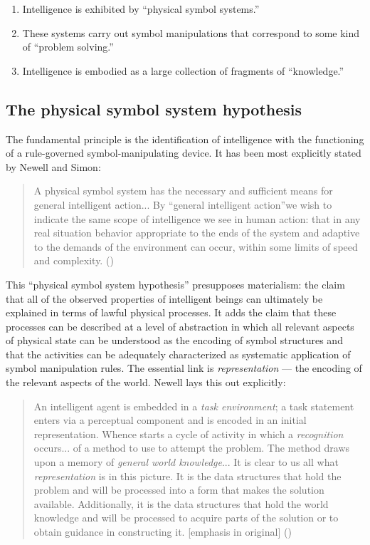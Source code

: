 \documentclass[12pt]{article}
\def\bq{\begin{quote}}
\def\eq{\end{quote}}
\begin{document}
\begin{enumerate}
\item Intelligence is exhibited by ``physical symbol systems.''
\item These systems carry out symbol manipulations that correspond to some
kind of ``problem solving.''
\item Intelligence is embodied as a large collection of fragments of
``knowledge.''
\end{enumerate}

\subsection{The physical symbol system hypothesis}

The fundamental principle is the identification of intelligence with the functioning of a rule-governed symbol-manipulating device. It has been most explicitly stated by Newell and Simon:

\bq
A physical symbol system has the necessary and sufficient means for general intelligent action... By ``general intelligent action''we wish to indicate the same scope of intelligence we see in human action: that in any real situation behavior appropriate to the ends of the system and adaptive to the demands of the environment can occur, within some limits of speed and complexity. ({\it \cite{newell1976}})
\eq

This ``physical symbol system hypothesis'' presupposes materialism: the claim that all of the observed properties of intelligent beings can ultimately be explained in terms of lawful physical processes. It adds the claim that these processes can be described at a level of abstraction in which all relevant aspects of physical state can be understood as the encoding of symbol structures and that the activities can be adequately characterized as systematic application of symbol manipulation rules.
The essential link is {\it representation} --- the encoding of the relevant aspects of the world. Newell lays this out explicitly:
\bq
An intelligent agent is embedded in a {\it task environment};  a task statement
enters via a perceptual component and is encoded in an initial
representation. Whence starts a cycle of activity in which a {\it recognition} occurs... of a method to use to attempt the problem. The method draws upon a memory of {\it general world knowledge}...
It is clear to us all what {\it representation} is in this picture. It is the data structures that hold the problem and will be processed into a form that makes the solution available. Additionally, it is the data structures that hold the world knowledge and will be processed to acquire parts of the solution or to obtain guidance in constructing it. [emphasis in original] ({\it \cite{newell1982}})
\eq
\end{document}
